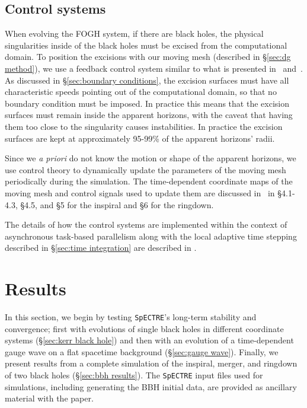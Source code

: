 \begin{bibunit}[unsrtnat]
\subsection{Control systems\label{sec:control systems}} When evolving the FOGH
system, if there are black holes, the physical singularities inside of the black
holes must be excised from the computational domain. To position the excisions
with our moving mesh (described in \S\ref{sec:dg method}), we use a feedback
control system similar to what is presented in~\cite{Scheel:2006gg}
and~\cite{Hemberger:2012jz}. As discussed in \S\ref{sec:boundary conditions},
the excision surfaces must have all characteristic speeds pointing out of the
computational domain, so that no boundary condition must be imposed. In practice
this means that the excision surfaces must remain inside the apparent horizons,
with the caveat that having them too close to the singularity causes
instabilities. In practice the excision surfaces are kept at approximately
95-99\% of the apparent horizons' radii.

Since we \textit{a priori} do not know the motion or shape of the apparent
horizons, we use control theory to dynamically update the parameters of
the moving mesh periodically during the simulation. The time-dependent
coordinate maps of the moving mesh and control
signals used to update them are discussed in~\cite{Hemberger:2012jz} in
\S 4.1-4.3, \S 4.5, and \S 5 for the inspiral and \S 6 for the ringdown.

The details of how the control systems are implemented within the context of
asynchronous task-based parallelism along with the local adaptive time stepping
described in \S\ref{sec:time integration} are described in
\cite{Nelli:2025inprep}.

\section{Results\label{sec:results}}

In this section, we begin by testing \texttt{SpECTRE}'s long-term stability and
convergence; first with evolutions of single black holes in different coordinate
systems (\S\ref{sec:kerr black hole}) and then with an evolution of a
time-dependent gauge wave on a flat spacetime background (\S\ref{sec:gauge
wave}). Finally, we present results from a complete simulation of the inspiral,
merger, and ringdown of two black holes (\S\ref{sec:bbh results}). The
\texttt{SpECTRE} input files used for simulations, including generating the BBH
initial data, are provided as ancillary material with the paper.


\end{bibunit}
